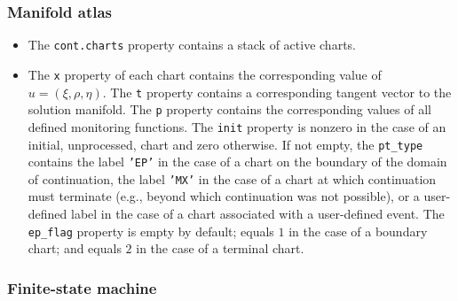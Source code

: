 \documentclass{article}
\begin{document}
\subsubsection{Manifold atlas}

\begin{itemize}
\item The \texttt{cont.charts} property contains a stack of active charts.

\item The \texttt{x} property of each chart contains the corresponding value
of $u=\left( \xi ,\rho ,\eta \right) $. The \texttt{t} property contains a
corresponding tangent vector to the solution manifold. The \texttt{p}
property contains the corresponding values of all defined monitoring
functions. The \texttt{init} property is nonzero in the case of an initial,
unprocessed, chart and zero otherwise. If not empty, the \texttt{pt\_type}
contains the label \texttt{'EP'} in the case of a chart on the boundary of
the domain of continuation, the label \texttt{'MX'} in the case of a chart
at which continuation must terminate (e.g., beyond which continuation was
not possible), or a user-defined label in the case of a chart associated
with a user-defined event. The \texttt{ep\_flag} property is empty by
default; equals $1$ in the case of a boundary chart; and equals $2$ in the
case of a terminal chart.
\end{itemize}

\subsubsection{Finite-state machine}
\end{document}
